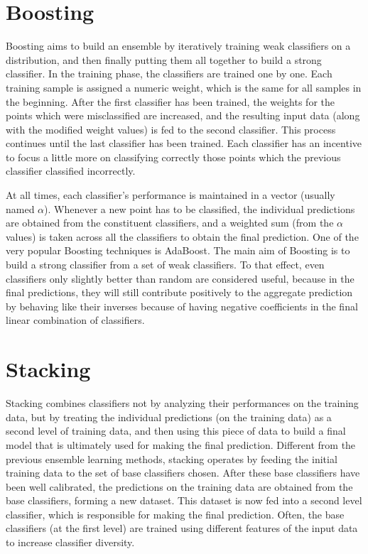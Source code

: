 \section{Boosting}
Boosting aims to build an ensemble by iteratively training weak classifiers on a distribution, and then finally putting them all together to build a strong classifier. In the training phase, the classifiers are trained one by one. Each training sample is assigned a numeric weight, which is the same for all samples in the beginning. After the first classifier has been trained, the weights for the points which were misclassified are increased, and the resulting input data (along with the modified weight values) is fed to the second classifier. This process continues until the last classifier has been trained. Each classifier has an incentive to focus a little more on classifying correctly those points which the previous classifier classified incorrectly.

At all times, each classifier's performance is maintained in a vector (usually named $\alpha$). Whenever a new point has to be classified, the individual predictions are obtained from the constituent classifiers, and a weighted sum (from the $\alpha$ values) is taken across all the classifiers to obtain the final prediction. One of the very popular Boosting techniques is AdaBoost. The main aim of Boosting is to build a strong classifier from a set of weak classifiers. To that effect, even classifiers only slightly better than random are considered useful, because in the final predictions, they will still contribute positively to the aggregate prediction by behaving like their inverses because of having negative coefficients in the final linear combination of classifiers.

\section{Stacking}
Stacking combines classifiers not by analyzing their performances on the training data, but by treating the individual predictions (on the training data) as a second level of training data, and then using this piece of data to build a final model that is ultimately used for making the final prediction. Different from the previous ensemble learning methods, stacking operates by feeding the initial training data to the set of base classifiers chosen. After these base classifiers have been well calibrated, the predictions on the training data are obtained from the base classifiers, forming a new dataset. This dataset is now fed into a second level classifier, which is responsible for making the final prediction. Often, the base classifiers (at the first level) are trained using different features of the input data to increase classifier diversity.


